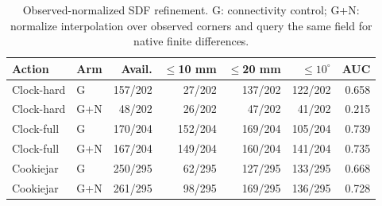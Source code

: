 \begin{table}[t]\centering\scriptsize
\caption{Observed-normalized SDF refinement. G: connectivity control; G+N: normalize interpolation over observed corners and query the same field for native finite differences.}
\label{tab:normalized-sdf}
\begin{tabular}{llrrrrr}\toprule
Action & Arm & Avail. & $\leq$10 mm & $\leq$20 mm & $\leq10^\circ$ & AUC\\\midrule
Clock-hard & G & 157/202 & 27/202 & 137/202 & 122/202 & 0.658\\
Clock-hard & G+N & 48/202 & 26/202 & 47/202 & 41/202 & 0.215\\
Clock-full & G & 170/204 & 152/204 & 169/204 & 105/204 & 0.739\\
Clock-full & G+N & 167/204 & 149/204 & 160/204 & 141/204 & 0.735\\
Cookiejar & G & 250/295 & 62/295 & 127/295 & 133/295 & 0.668\\
Cookiejar & G+N & 261/295 & 98/295 & 169/295 & 136/295 & 0.728\\
\bottomrule\end{tabular}\end{table}
